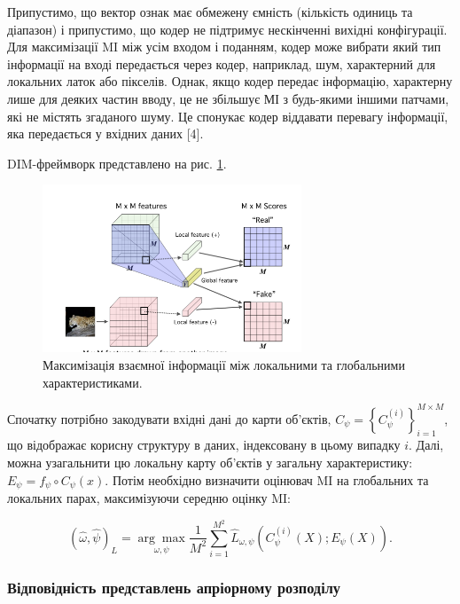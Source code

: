 Припустимо, що вектор ознак має обмежену ємність (кількість одиниць та діапазон) і припустимо, що кодер не підтримує нескінченні вихідні конфігурації. Для максимізації MI між усім входом і поданням, кодер може вибрати який тип інформації на вході передається через кодер, наприклад, шум, характерний для локальних латок або пікселів. Однак, якщо кодер передає інформацію, характерну лише для деяких частин вводу, це не збільшує МІ з будь-якими іншими патчами, які не містять згаданого шуму. Це спонукає кодер віддавати перевагу інформації, яка передається у вхідних даних [4].

DIM-фреймворк представлено на рис. \ref{fig:deepinfo3}. 

\vspace{1em}

\begin{figure}[h]
  \includegraphics[width=\textwidth, height=5cm, natwidth=291, natheight=188]{Mal/deepinfo3.jpg}
  \caption{Максимізація взаємної інформації між локальними та глобальними характеристиками.}
  \label{fig:deepinfo3}
\end{figure}

Спочатку потрібно закодувати вхідні дані до карти об’єктів, $C_{\psi} = \left\{ C_{\psi}^{(i)} \right\}_{i=1}^{M \times M}$, що відображає корисну структуру в даних, індексовану в цьому випадку $i$. Далі, можна узагальнити цю локальну карту об’єктів у загальну характеристику: $E_{\psi} = f_{\psi} \circ C_{\psi}(x)$. Потім необхідно визначити оцінювач MI на глобальних та локальних парах, максимізуючи середню оцінку MI:

\begin{equation}\label{eq:max_mi}
(\hat{\omega}, \hat{\psi})_{L} = \underset{\omega,\psi}{\arg\max}\frac{1}{M^{2}}\sum_{i=1}^{M^{2}}\hat{L}_{\omega, \psi}(C_{\psi}^{(i)}(X); E_{\psi}(X)).
\end{equation}

\vspace{1.5em}

\subsubsection{Відповідність представлень апріорному розподілу}

